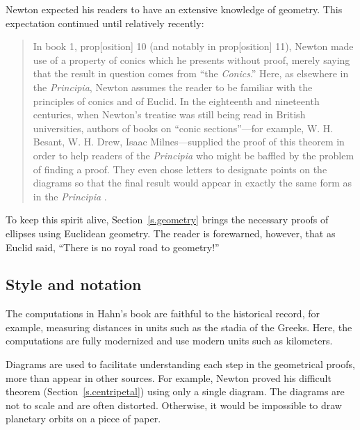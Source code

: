 Newton expected his readers to have an extensive knowledge of geometry. This expectation continued until relatively recently:
\begin{quote}
In book 1, prop[osition] 10 (and notably in prop[osition] 11), Newton made use of a property of conics which he presents without proof, merely saying that the result in question comes from ``the \textit{Conics}.'' Here, as elsewhere in the \textit{Principia}, Newton assumes the reader to be familiar with the principles of conics and of Euclid. In the eighteenth and nineteenth centuries, when Newton's treatise was still being read in British universities, authors of books on ``conic sections''---for example, W. H. Besant, W. H. Drew, Isaac Milnes---supplied the proof of this theorem in order to help readers of the \textit{Principia} who might be baffled by the problem of finding a proof. They even chose letters to designate points on the diagrams so that the final result would appear in exactly the same form as in the \textit{Principia} \cite[p.~330]{newton-cohen}.
\end{quote}

To keep this spirit alive, Section~\ref{s.geometry} brings the necessary proofs of ellipses using Euclidean geometry. The reader is forewarned, however, that as Euclid said, ``There is no royal road to geometry!''

\subsection*{Style and notation}

The computations in Hahn's book are faithful to the historical record, for example, measuring distances in units such as the stadia of the Greeks. Here,  the computations are fully modernized and use modern units such as kilometers. 

Diagrams are used to facilitate understanding each step in the geometrical proofs, more than appear in other sources. For example, Newton proved his difficult theorem (Section~\ref{s.centripetal}) using only a single diagram. The diagrams are not to scale and are often distorted. Otherwise, it would be impossible to draw planetary orbits on a piece of paper.

